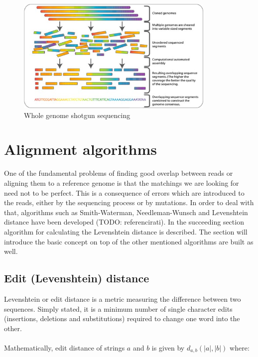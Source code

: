 \documentclass[times, utf8, diplomski]{fer}
\begin{document}
\begin{figure}[!ht]
\begin{center}
	\includegraphics[width=0.85\textwidth]{../img/Whole_genome_shotgun_sequencing.png}
	\caption{Whole genome shotgun sequencing}\label{shotgun.sequencing}
\end{center}
\end{figure}

\section{Alignment algorithms}

One of the fundamental problems of finding good overlap between reads or aligning them to a reference genome is that the matchings we are looking for need not to be perfect. This is a consequence of errors which are introduced to the reads, either by the sequencing process or by mutations. In order to deal with that, algorithms such as Smith-Waterman, Needleman-Wunsch and Levenshtein distance have been developed (TODO: referencirati). In the succeeding section algorithm for calculating the Levenshtein distance is described. The section will introduce the basic concept on top of the other mentioned algorithms are built as well.

\subsection{Edit (Levenshtein) distance}

Levenshtein or edit distance is a metric measuring the difference between two sequences. Simply stated, it is a minimum number of single character edits (insertions, deletions and substitutions) required to change one word into the other.
\\
\\
Mathematically, edit distance of strings $a$ and $b$ is given by $d_{a,b}(|a|,|b|)$ where:
\end{document}
